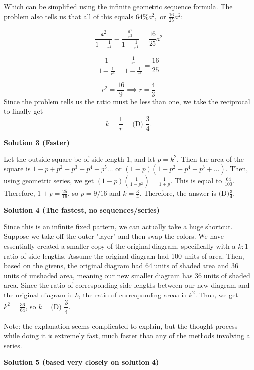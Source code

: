 \begin{enumerate}
 Which can be simplified using the infinite geometric sequence formula. The problem also tells us that all of this equals $64\% a^2,$ or $\frac{16}{25}a^2:$

 \[\frac{a^2}{1 - \frac{1}{r^4}} - \frac{\frac{a^2}{r^2}}{1 - \frac{1}{r^4}} = \frac{16}{25}a^2\]

 \[\frac{1}{1 - \frac{1}{r^4}} - \frac{\frac{1}{r^2}}{1 - \frac{1}{r^4}} = \frac{16}{25}\]

 \[r^2 = \frac{16}{9} \implies r = \frac{4}{3}\] Since the problem tells us the ratio must be less than one, we take the reciprocal to finally get  
 \[k = \frac{1}{r} = \boxed{\text{(D) }\dfrac{3}{4}}.\]




\textbf{Solution 3 (Faster)}

Let the outside square be of side length $1$, and let $p = k^2$. Then the area of the square is $1-p+p^{2}-p^{3}+p^{4}-p^{5} \dots$ or $\left(1-p\right)\left(1+p^{2}+p^{4}+p^{6}+\dots\right)$. Then, using geometric series, we get $\left(1-p\right)\left(\frac{1}{1-p^{2}}\right) = \frac{1}{1+p}$. This is equal to $\frac{64}{100}$. Therefore, $1+p=\frac{25}{16}$, so $p = 9/16$ and $k = \frac{3}{4}$. Therefore, the answer is $\boxed{\text{(D)}\frac{3}{4}}.$




\textbf{Solution 4 (The fastest, no sequences/series)}

Since this is an infinite fixed pattern, we can actually take a huge shortcut. Suppose we take off the outer "layer" and then swap the colors. We have essentially created a smaller copy of the original diagram, specifically with a $k:1$ ratio of side lengths. Assume the original diagram had 100 units of area. Then, based on the givens, the original diagram had 64 units of shaded area and 36 units of unshaded area, meaning our new smaller diagram has 36 units of shaded area. Since the ratio of corresponding side lengths between our new diagram and the original diagram is $k$, the ratio of corresponding areas is $k^2$. Thus, we get $k^2 = \frac{36}{64}$, so $k = \boxed{\text{(D) }\dfrac{3}{4}}$.

 Note: the explanation seems complicated to explain, but the thought process while doing it is extremely fast, much faster than any of the methods involving a series.

 


 



\textbf{Solution 5 (based very closely on solution 4)}


\end{enumerate}
